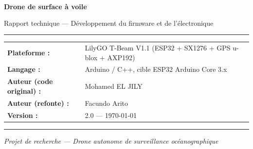 \documentclass[12pt,a4paper]{article}
\begin{document}
\begin{titlepage}
  \centering
  \vspace*{2cm}
  {\Huge\bfseries Drone de surface à voile\par}
  \vspace{0.5cm}
  {\Large Rapport technique — Développement du firmware et de l'électronique\par}
  \vspace{2cm}
  \rule{\linewidth}{1pt}
  \vspace{0.5cm}

  \begin{tabular}{ll}
    \textbf{Plateforme :} & LilyGO T-Beam V1.1 (ESP32 + SX1276 + GPS u-blox + AXP192) \\[4pt]
    \textbf{Langage :}    & Arduino / C++, cible ESP32 Arduino Core 3.x \\[4pt]
    \textbf{Auteur (code original) :} & Mohamed EL JILY \\[4pt]
    \textbf{Auteur (refonte) :}       & Facundo Arito \\[4pt]
    \textbf{Version :}    & 2.0 — \today \\
  \end{tabular}

  \vspace{0.5cm}
  \rule{\linewidth}{1pt}
  \vspace{2cm}

  \begin{abstract}
    Ce document retrace l'intégralité du développement informatique et électronique
    du drone de surface à voile basé sur le module T-Beam d'Espressif/LilyGO.
    Il couvre le code original et ses limitations, la réécriture complète de
    l'architecture logicielle, les deux révisions du PCB, tous les problèmes
    matériels et logiciels rencontrés, ainsi que les solutions mises en place.
    Le document est structuré pour être mis à jour facilement au fil des phases
    futures du projet.
  \end{abstract}

  \vfill
  \textit{Projet de recherche — Drone autonome de surveillance océanographique}
\end{titlepage}

\tableofcontents
\newpage

\end{document}
